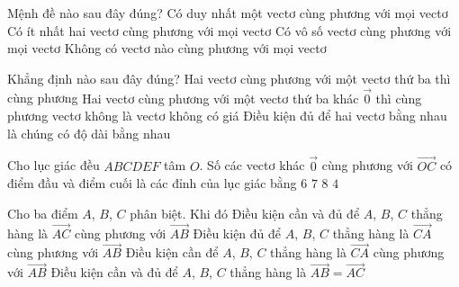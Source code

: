 \begin{ex}%
	Mệnh đề nào sau đây đúng?
	\choice
	{\True Có duy nhất một vectơ cùng phương với mọi vectơ}
	{Có ít nhất hai vectơ cùng phương với mọi vectơ}
	{Có vô số vectơ cùng phương với mọi vectơ}
	{Không có vectơ nào cùng phương với mọi vectơ}
\end{ex}


\begin{ex}%
	Khẳng định nào sau đây đúng?
	\choice
	{Hai vectơ cùng phương với một vectơ thứ ba thì cùng phương}
	{\True Hai vectơ cùng phương với một vectơ thứ ba khác $\overrightarrow{0}$ thì cùng phương}
	{vectơ không là vectơ không có giá}
	{Điều kiện đủ để hai vectơ bằng nhau là chúng có độ dài bằng nhau}
\end{ex}

\begin{ex}%
	Cho lục giác đều $ABCDEF$ tâm $O$. Số các vectơ khác $\overrightarrow{0}$ cùng phương với $\overrightarrow{OC}$ có điểm đầu và điểm cuối là các đỉnh của lục giác bằng
	\choice
	{\True $6$}
	{$7$}
	{$8$}
	{$4$}
\end{ex}

\begin{ex}%
	Cho ba điểm $ A $, $ B $, $ C $ phân biệt. Khi đó
	\choice
	{\True Điều kiện cần và đủ để $ A $, $ B $, $ C $ thẳng hàng là $ \overrightarrow{AC} $ cùng phương với $ \overrightarrow{AB} $}
	{Điều kiện đủ để $ A $, $ B $, $ C $ thẳng hàng là $ \overrightarrow{CA} $ cùng phương với $ \overrightarrow{AB} $}
	{Điều kiện cần để $ A $, $ B $, $ C $ thẳng hàng là $ \overrightarrow{CA} $ cùng phương với $ \overrightarrow{AB} $}
	{Điều kiện cần và đủ để $ A $, $ B $, $ C $ thẳng hàng là $ \overrightarrow{AB} = \overrightarrow{AC} $}
\end{ex}

